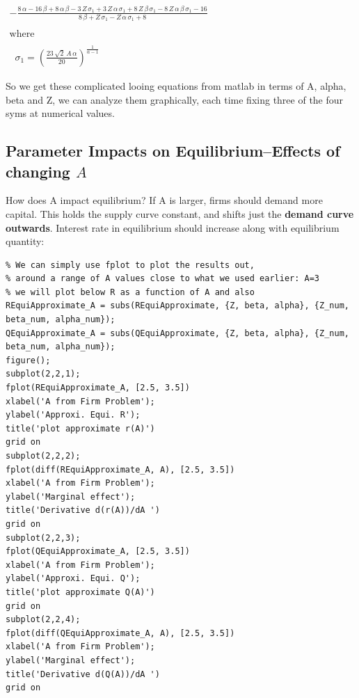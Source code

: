 \documentclass[
]{book}
\begin{document}
\(\displaystyle \begin{array}{l} -\frac{8\,\alpha -16\,\beta +8\,\alpha \,\beta -3\,Z\,\sigma_1 +3\,Z\,\alpha \,\sigma_1 +8\,Z\,\beta \,\sigma_1 -8\,Z\,\alpha \,\beta \,\sigma_1 -16}{8\,\beta +Z\,\sigma_1 -Z\,\alpha \,\sigma_1 +8}\\ \mathrm{}\\ \textrm{where}\\ \mathrm{}\\ \;\;\sigma_1 ={{\left(\frac{23\,\sqrt{2}\,A\,\alpha }{20}\right)}}^{\frac{1}{\alpha -1}} \end{array}\)

So we get these complicated looing equations from matlab in terms of A,
alpha, beta and Z, we can analyze them graphically, each time fixing
three of the four syms at numerical values.

\hypertarget{parameter-impacts-on-equilibriumeffects-of-changing-a}{%
\subsection{\texorpdfstring{Parameter Impacts on Equilibrium--Effects of changing \(A\)}{Parameter Impacts on Equilibrium--Effects of changing A}}\label{parameter-impacts-on-equilibriumeffects-of-changing-a}}

How does A impact equilibrium? If A is larger, firms should demand more
capital. This holds the supply curve constant, and shifts just the
\textbf{demand curve outwards}. Interest rate in equilibrium should increase
along with equilibrium quantity:

\begin{verbatim}
% We can simply use fplot to plot the results out, 
% around a range of A values close to what we used earlier: A=3
% we will plot below R as a function of A and also 
REquiApproximate_A = subs(REquiApproximate, {Z, beta, alpha}, {Z_num, beta_num, alpha_num});
QEquiApproximate_A = subs(QEquiApproximate, {Z, beta, alpha}, {Z_num, beta_num, alpha_num});
figure();
subplot(2,2,1);
fplot(REquiApproximate_A, [2.5, 3.5])
xlabel('A from Firm Problem');
ylabel('Approxi. Equi. R');
title('plot approximate r(A)')
grid on
subplot(2,2,2);
fplot(diff(REquiApproximate_A, A), [2.5, 3.5])
xlabel('A from Firm Problem');
ylabel('Marginal effect');
title('Derivative d(r(A))/dA ')
grid on
subplot(2,2,3);
fplot(QEquiApproximate_A, [2.5, 3.5])
xlabel('A from Firm Problem');
ylabel('Approxi. Equi. Q');
title('plot approximate Q(A)')
grid on
subplot(2,2,4);
fplot(diff(QEquiApproximate_A, A), [2.5, 3.5])
xlabel('A from Firm Problem');
ylabel('Marginal effect');
title('Derivative d(Q(A))/dA ')
grid on
\end{verbatim}
\end{document}

